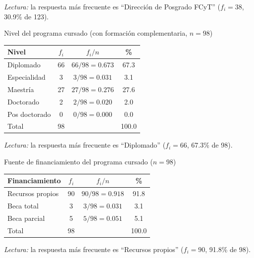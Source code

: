 \textit{Lectura:} la respuesta más frecuente es ``Dirección de Posgrado FCyT'' ($f_i = 38$, 30.9\% de 123).

\begin{mitabla}{Nivel del programa cursado (con formación complementaria, $n=98$)}
\begin{tabular}{lccc}
\toprule
Nivel & $f_i$ & $f_i / n$ & \% \\
\midrule
Diplomado & 66 & $66/98 = 0.673$ & 67.3 \\
Especialidad & 3 & $3/98 = 0.031$ & 3.1 \\
Maestría & 27 & $27/98 = 0.276$ & 27.6 \\
Doctorado & 2 & $2/98 = 0.020$ & 2.0 \\
Pos doctorado & 0 & $0/98 = 0.000$ & 0.0 \\
\midrule
Total & 98 & & 100.0 \\
\bottomrule
\end{tabular}
\end{mitabla}

\textit{Lectura:} la respuesta más frecuente es ``Diplomado'' ($f_i = 66$, 67.3\% de 98).

\begin{mitabla}{Fuente de financiamiento del programa cursado ($n=98$)}
\begin{tabular}{lccc}
\toprule
Financiamiento & $f_i$ & $f_i / n$ & \% \\
\midrule
Recursos propios & 90 & $90/98 = 0.918$ & 91.8 \\
Beca total & 3 & $3/98 = 0.031$ & 3.1 \\
Beca parcial & 5 & $5/98 = 0.051$ & 5.1 \\
\midrule
Total & 98 & & 100.0 \\
\bottomrule
\end{tabular}
\end{mitabla}

\textit{Lectura:} la respuesta más frecuente es ``Recursos propios'' ($f_i = 90$, 91.8\% de 98).

